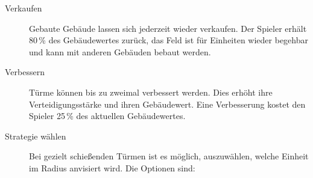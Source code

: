 \begin{description}
  \item[Verkaufen] Gebaute Gebäude lassen sich jederzeit wieder verkaufen. Der
    Spieler erhält 80\,\% des Gebäudewertes zurück, das Feld ist für
    Einheiten wieder begehbar und kann mit anderen Gebäuden bebaut werden.

  \item[Verbessern] Türme können bis zu zweimal verbessert werden. Dies erhöht
    ihre Verteidigungsstärke und ihren Gebäudewert. Eine Verbesserung kostet
    den Spieler 25\,\% des aktuellen Gebäudewertes.

  \item[Strategie wählen] Bei gezielt schießenden Türmen ist es möglich,
    auszuwählen, welche Einheit im Radius anvisiert wird. Die Optionen sind:

\end{description}
